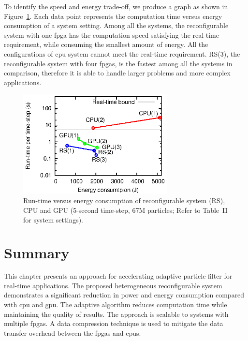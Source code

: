 To identify the speed and energy trade-off, we produce a graph as shown in Figure~\ref{fig:scale}. 
Each data point represents the computation time versus energy consumption of a system setting.
Among all the systems, the reconfigurable system with one \gls{fpga} has the computation speed satisfying the real-time requirement, while consuming the smallest amount of energy.
All the configurations of \gls{cpu} system cannot meet the real-time requirement.
RS(3), the reconfigurable system with four \glspl{fpga}, is the fastest among all the systems in comparison, therefore it is able to handle larger problems and more complex applications.

\begin{figure}[t!]
\centering
\includegraphics[width=0.7\textwidth]{4_adaptation/figures/fig_scale}
\caption[Run-time versus energy consumption of reconfigurable system (RS), CPU and GPU]{Run-time versus energy consumption of reconfigurable system (RS), CPU and GPU (5-second time-step, 67M particles; Refer to Table~II for system settings).}
\label{fig:scale}
\end{figure}


\section{Summary}
\label{sec:reconfig_summary}

This chapter presents an approach for accelerating adaptive particle filter for real-time applications.
The proposed heterogeneous reconfigurable system demonstrates a significant reduction in power and energy consumption compared with \gls{cpu} and \gls{gpu}.
The adaptive algorithm reduces computation time while maintaining the quality of results. 
The approach is scalable to systems with multiple \glspl{fpga}.
A data compression technique is used to mitigate the data transfer overhead between the \glspl{fpga} and \glspl{cpu}.



